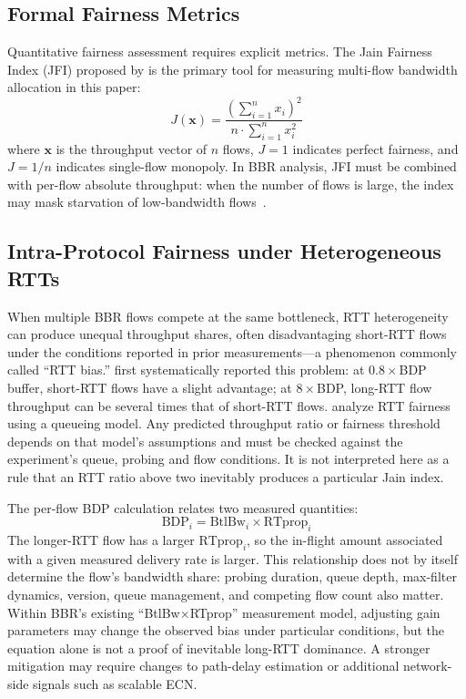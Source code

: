 \documentclass[a4paper,fleqn]{cas-sc}
\begin{document}
\subsection{Formal Fairness Metrics}
\label{sec:fairness_metric}

Quantitative fairness assessment requires explicit metrics. The Jain Fairness
Index (JFI) proposed by \citet{jain1984fairness} is the primary tool for
measuring multi-flow bandwidth allocation in this paper:
\begin{equation}
  \label{eq:jfi}
  J(\mathbf{x}) = \frac{\left(\sum_{i=1}^{n} x_i\right)^2}{n \cdot \sum_{i=1}^{n} x_i^2}
\end{equation}
where $\mathbf{x}$ is the throughput vector of $n$ flows, $J=1$ indicates perfect
fairness, and $J=1/n$ indicates single-flow monopoly. In BBR analysis, JFI must
be combined with per-flow absolute throughput: when the number of flows is large,
the index may mask starvation of low-bandwidth flows~\citep{abrol2026bbr}.

\subsection{Intra-Protocol Fairness under Heterogeneous RTTs}
\label{sec:rtt_skew}

When multiple BBR flows compete at the same bottleneck, RTT heterogeneity can
produce unequal throughput shares, often disadvantaging short-RTT flows under
the conditions reported in prior measurements---a phenomenon commonly called
``RTT bias.'' \citet{hock2017bbr} first systematically reported this problem: at
$0.8\times$BDP buffer, short-RTT flows have a slight advantage; at $8\times$BDP,
long-RTT flow throughput can be several times that of short-RTT flows.
\citet{tao2018rtt} analyze RTT fairness using a queueing model. Any
predicted throughput ratio or fairness threshold depends on that model's
assumptions and must be checked against the experiment's queue, probing
and flow conditions. It is not interpreted here as a rule that an RTT
ratio above two inevitably produces a particular Jain index.

The per-flow BDP calculation relates two measured quantities:
\begin{equation}
  \label{eq:bdp}
  \mathrm{BDP}_i = \mathrm{BtlBw}_i \times \mathrm{RTprop}_i
\end{equation}
The longer-RTT flow has a larger $\mathrm{RTprop}_i$, so the in-flight amount
associated with a given measured delivery rate is larger. This relationship does
not by itself determine the flow's bandwidth share: probing duration, queue depth,
max-filter dynamics, version, queue management, and competing flow count also
matter. Within BBR's existing ``BtlBw$\times$RTprop'' measurement model,
adjusting gain parameters may change the observed bias under particular
conditions, but the equation alone is not a proof of inevitable long-RTT
dominance. A stronger mitigation may require changes to path-delay estimation or
additional network-side signals such as scalable ECN.
\end{document}
